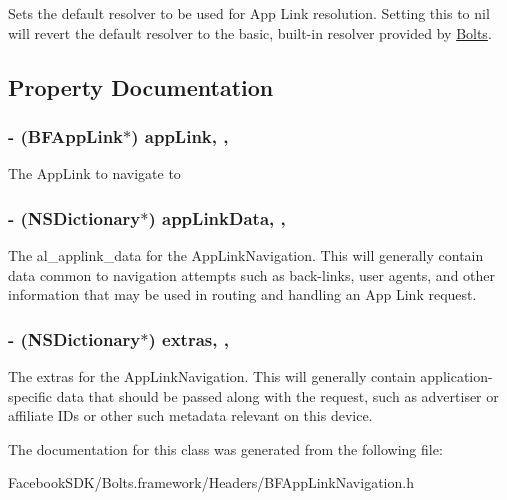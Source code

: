 Sets the default resolver to be used for App Link resolution. Setting this to nil will revert the default resolver to the basic, built-\/in resolver provided by \hyperlink{interface_bolts}{Bolts}. 

\subsection{Property Documentation}
\hypertarget{interface_b_f_app_link_navigation_a052e0aa4d7101904ca825a21712cdd7b}{
\subsubsection[{app\-Link}]{\setlength{\rightskip}{0pt plus 5cm}-\/ ({\bf B\-F\-App\-Link}$\ast$) app\-Link\hspace{0.3cm}{\ttfamily [read]}, {\ttfamily [nonatomic]}, {\ttfamily [strong]}}}\label{interface_b_f_app_link_navigation_a052e0aa4d7101904ca825a21712cdd7b}
The App\-Link to navigate to \hypertarget{interface_b_f_app_link_navigation_a2412a1d4fa49c52d7883bee810e5026d}{
\subsubsection[{app\-Link\-Data}]{\setlength{\rightskip}{0pt plus 5cm}-\/ (N\-S\-Dictionary$\ast$) app\-Link\-Data\hspace{0.3cm}{\ttfamily [read]}, {\ttfamily [nonatomic]}, {\ttfamily [copy]}}}\label{interface_b_f_app_link_navigation_a2412a1d4fa49c52d7883bee810e5026d}
The al\-\_\-applink\-\_\-data for the App\-Link\-Navigation. This will generally contain data common to navigation attempts such as back-\/links, user agents, and other information that may be used in routing and handling an App Link request. \hypertarget{interface_b_f_app_link_navigation_a75478e20d3d2f13c93e8d0cd79b20b2c}{
\subsubsection[{extras}]{\setlength{\rightskip}{0pt plus 5cm}-\/ (N\-S\-Dictionary$\ast$) extras\hspace{0.3cm}{\ttfamily [read]}, {\ttfamily [nonatomic]}, {\ttfamily [copy]}}}\label{interface_b_f_app_link_navigation_a75478e20d3d2f13c93e8d0cd79b20b2c}
The extras for the App\-Link\-Navigation. This will generally contain application-\/specific data that should be passed along with the request, such as advertiser or affiliate I\-Ds or other such metadata relevant on this device. 

The documentation for this class was generated from the following file\-:\begin{DoxyCompactItemize}
\item 
Facebook\-S\-D\-K/\-Bolts.\-framework/\-Headers/B\-F\-App\-Link\-Navigation.\-h\end{DoxyCompactItemize}
